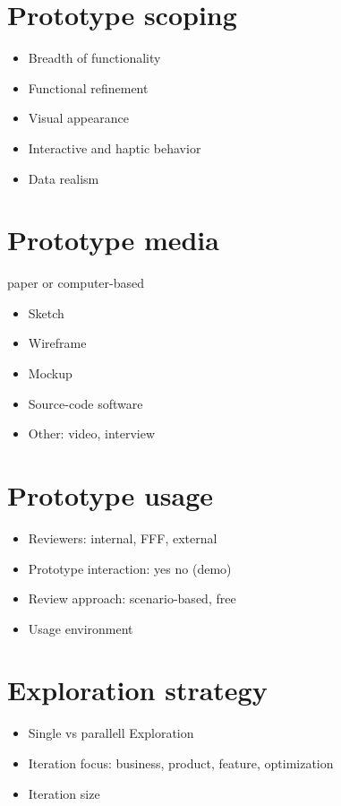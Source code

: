 \documentclass{reqengbook}
\begin{document}
\section{Prototype scoping}

\begin{itemize}
  \item Breadth of functionality
  \item Functional refinement
  \item Visual appearance
  \item Interactive and haptic behavior
  \item Data realism
\end{itemize}


\section{Prototype media}
paper or computer-based
\begin{itemize}
  \item Sketch 
  \item Wireframe
  \item Mockup
  \item Source-code software
  \item Other: video, interview
\end{itemize}

\section{Prototype usage}
\begin{itemize}
  \item Reviewers: internal, FFF, external
  \item Prototype interaction: yes no (demo)
  \item Review approach: scenario-based, free
  \item Usage environment
\end{itemize}

\section{Exploration strategy}
\begin{itemize}
  \item Single vs parallell Exploration
  \item Iteration focus: business, product, feature, optimization
  \item Iteration size
\end{itemize}
\end{document}
